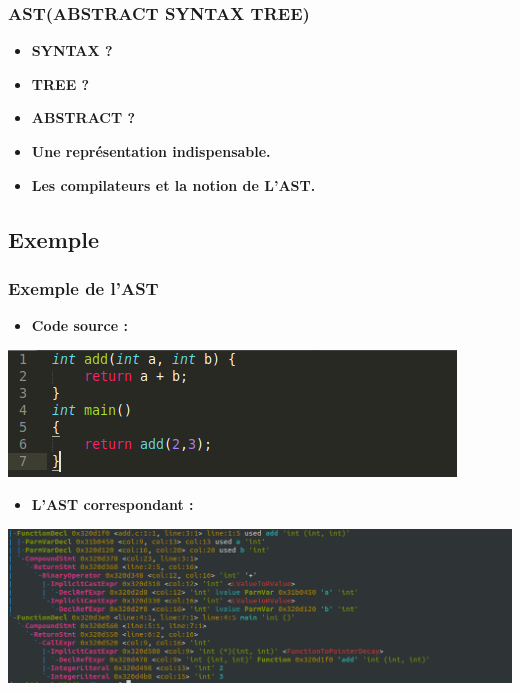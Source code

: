 \documentclass[hyperref={bookmarks=false},aspectratio=169]{beamer}
\begin{document}
\begin{frame}
\frametitle{AST(ABSTRACT SYNTAX TREE)}
\begin{itemize}
	\item \textbf{SYNTAX ?}
	\item \textbf{TREE ?}
	\item \textbf{ABSTRACT ?}	
    \item \textbf{Une représentation indispensable.}
    \item \textbf{Les compilateurs et la notion de L'AST.}
\end{itemize}
  

\end{frame}
\subsection{Exemple}


\begin{frame}
\frametitle{Exemple de l'AST}
\begin{itemize}
	\item \textbf{Code source :}
\end{itemize}
\vfill
\begin{center} \includegraphics[scale=0.3]{./figures/add.png}  \end{center}
\vfill
\begin{itemize}
	\item \textbf{L'AST correspondant :}
\end{itemize}  
\vfill
\begin{center} \includegraphics[scale=0.4]{./figures/ast.png} \end{center}
\vfill

\end{frame}
\end{document}
